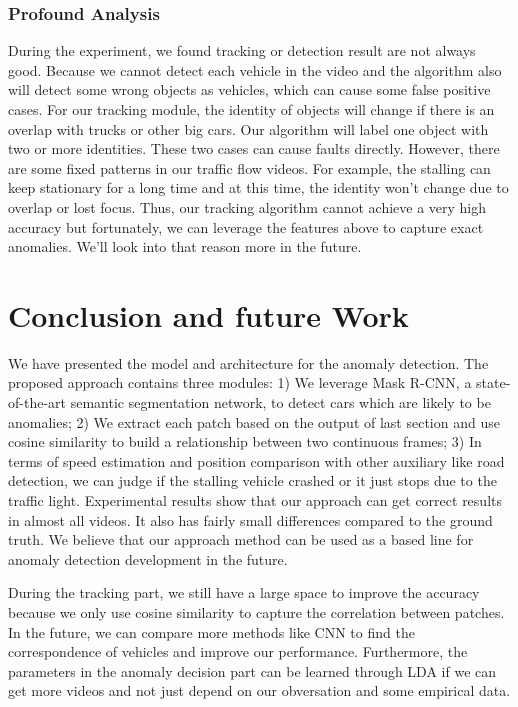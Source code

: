 \documentclass[10pt,twocolumn,letterpaper]{article}
\begin{document}
\subsubsection{Profound Analysis}

During the experiment, we found tracking or detection result are not always good. Because we cannot detect each vehicle in the video and the algorithm also will detect some wrong objects as vehicles, which can cause some false positive cases. For our tracking module, the identity of objects will change if there is an overlap with trucks or other big cars. Our algorithm will label one object with two or more identities. These two cases can cause faults directly. However, there are some fixed patterns in our traffic flow videos. For example, the stalling can keep stationary for a long time and at this time, the identity won't change due to overlap or lost focus. Thus, our tracking algorithm cannot achieve a very high accuracy but fortunately, we can leverage the features above to capture exact anomalies. We'll look into that reason more in the future.

\section{Conclusion and future Work}

We have presented the model and architecture for the anomaly detection. The proposed approach contains three modules: 1) We leverage Mask R-CNN, a state-of-the-art semantic segmentation network, to detect cars which are likely to be anomalies; 2) We extract each patch based on the output of last section and use cosine similarity to build a relationship between two continuous frames; 3) In terms of speed estimation and position comparison with other auxiliary like road detection, we can judge if the stalling vehicle crashed or it just stops due to the traffic light. Experimental results show that our approach can get correct results in almost all videos. It also has fairly small differences compared to the ground truth. We believe that our approach method can be used as a based line for anomaly detection development in the future. 

During the tracking part, we still have a large space to improve the accuracy because we only use cosine similarity to capture the correlation between patches. In the future, we can compare more methods like CNN to find the correspondence of vehicles and improve our performance. Furthermore, the parameters in the anomaly decision part can be learned through LDA if we can get more videos and not just depend on our obversation and some empirical data.


{\small


}
\end{document}
